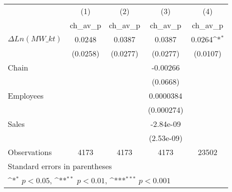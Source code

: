 {
\def\sym#1{\ifmmode^{#1}\else\(^{#1}\)\fi}
\begin{tabular}{l*{4}{c}}
\hline\hline
                    &\multicolumn{1}{c}{(1)}&\multicolumn{1}{c}{(2)}&\multicolumn{1}{c}{(3)}&\multicolumn{1}{c}{(4)}\\
                    &\multicolumn{1}{c}{ch\_av\_p}&\multicolumn{1}{c}{ch\_av\_p}&\multicolumn{1}{c}{ch\_av\_p}&\multicolumn{1}{c}{ch\_av\_p}\\
\hline
$\Delta Ln(MW\_{kt}) $&      0.0248         &      0.0387         &      0.0387         &      0.0264\sym{*}  \\
                    &    (0.0258)         &    (0.0277)         &    (0.0277)         &    (0.0107)         \\
[1em]
Chain               &                     &                     &    -0.00266         &                     \\
                    &                     &                     &    (0.0668)         &                     \\
[1em]
Employees           &                     &                     &   0.0000384         &                     \\
                    &                     &                     &  (0.000274)         &                     \\
[1em]
Sales               &                     &                     &   -2.84e-09         &                     \\
                    &                     &                     &  (2.53e-09)         &                     \\
\hline
Observations        &        4173         &        4173         &        4173         &       23502         \\
\hline\hline
\multicolumn{5}{l}{\footnotesize Standard errors in parentheses}\\
\multicolumn{5}{l}{\footnotesize \sym{*} \(p<0.05\), \sym{**} \(p<0.01\), \sym{***} \(p<0.001\)}\\
\end{tabular}
}
